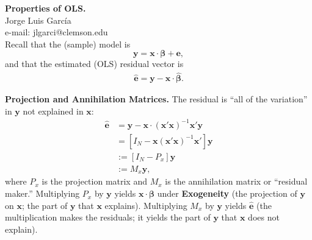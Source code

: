 
\let\counterwithout\relax
\let\counterwithin\relax
{}



\noindent \textbf{Properties of OLS.}\\
\noindent Jorge Luis García \\
\noindent e-mail: jlgarci@clemson.edu\\

\noindent Recall that the (sample) model is
\begin{equation}
\bm{y} = \bm{x} \cdot \bm{\beta} + \bm{e}, \label{eq:model}
\end{equation}
\noindent and that the estimated (OLS) residual vector is 
\begin{align}
\hat{\bm{e}} = \bm{y} - \bm{x} \cdot \hat{\bm{\beta}}.	
\end{align}

\noindent \textbf{Projection and Annihilation Matrices.} The residual is ``all of the variation'' in $\bm{y}$ not explained in $\bm{x}$: 
\begin{align}
	\hat{\bm{e}} & = \bm{y} - \bm{x} \cdot {\left( \bm{x}'\bm{x} \right)}^{-1} \bm{x}'\bm{y} \nonumber \\ 
	 			 & = \left[ I_N - \bm{x} {\left( \bm{x}'\bm{x} \right)}^{-1} \bm{x}' \right] \bm{y} \nonumber \\ 
	 			 & := \left[ I_{N} - P_x \right] \bm{y} \nonumber \\
	 			 & := M_x \bm{y}, 
\end{align}
\noindent where $P_x$ is the projection matrix and $M_{x}$ is the annihilation matrix or ``residual maker.'' Multiplying $P_{x}$ by $\bm{y}$ yields $ \bm{x} \cdot \bm{\beta}$ under \textbf{Exogeneity} (the projection of $\bm{y}$ on $\bm{x}$; the part of $\bm{y}$ that $\bm{x}$ explains). Multiplying $M_{x}$ by $\bm{y}$ yields $\hat{\bm{e}}$ (the multiplication makes the residuals; it yields the part of $\bm{y}$ that $\bm{x}$ does not explain).\\

